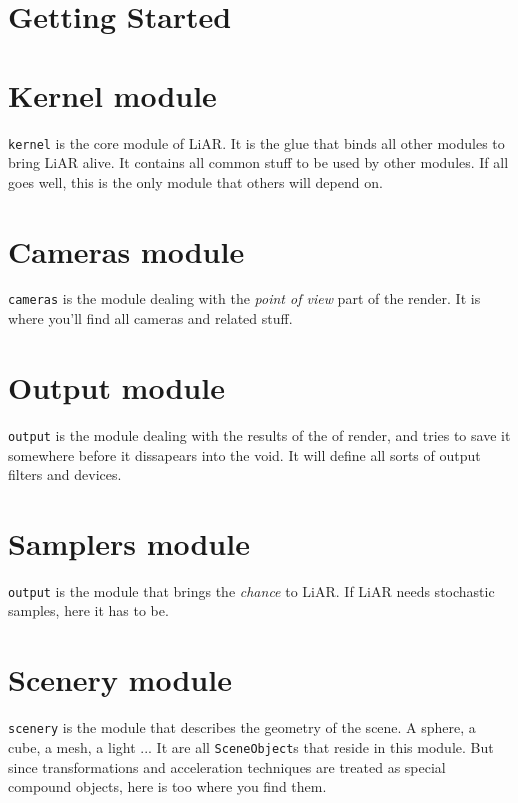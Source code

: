 \documentclass[10pt,a4paper,titlepage,english]{report}
\begin{document}

\chapter{Getting Started}

\chapter{Kernel module}

\texttt{kernel} is the core module of LiAR.  It is the glue that binds all other modules to bring LiAR alive.  It contains all common stuff to be used by other modules.  If all goes well, this is the only module that others will depend on.

\chapter{Cameras module}

\texttt{cameras} is the module dealing with the \emph{point of view} part of the render.  It is where you'll find all cameras and related stuff.

\chapter{Output module}

\texttt{output} is the module dealing with the results of the of render, and tries to save it somewhere before it dissapears into the void.  It will define all sorts of output filters and devices.

\chapter{Samplers module}

\texttt{output} is the module that brings the \emph{chance} to LiAR.  If LiAR needs stochastic samples, here it has to be.

\chapter{Scenery module}

\texttt{scenery} is the module that describes the geometry of the scene.  A sphere, a cube, a mesh, a light ...  It are all \texttt{SceneObject}s that reside in this module.  But since transformations and acceleration techniques are treated as special compound objects, here is too where you find them.
\end{document}
